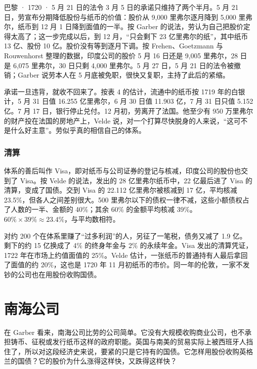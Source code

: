 \begin{case}{巴黎 · 1720 · 5 月 21 日的法令}
3 月 5 日的承诺只维持了两个半月。5 月 21 日，劳宣布分期降低股份与纸币的价值：股价从 9,000 里弗尔逐月降到 5,000 里弗尔，纸币到 12 月 1 日降到面值的一半\cite{velde2003}。按 Garber 的说法，劳认为自己把股价定得太高了；这一步完成以后，到 12 月，“只会剩下 23 亿里弗尔的纸”，其中纸币 13 亿、股份 10 亿\cite{garber1990}。股价没有等到逐月下调。按 Frehen、Goetzmann 与 Rouwenhorst 整理的数据，印度公司的股价 5 月 16 日还是 9,005 里弗尔，28 日是 6,075 里弗尔，30 日只剩 4,000 里弗尔\cite{fgr2009}。5 月 27 日，5 月 21 日的法令被撤销\cite{velde2003}；Garber 说劳本人在 5 月底被免职，很快又复职，主持了此后的紧缩\cite{garber1990}。

承诺一旦违背，就收不回来了。按表 4 的估计，流通中的纸币按 1719 年的白银计，5 月 31 日值 16.255 亿里弗尔，6 月 30 日值 11.903 亿，7 月 31 日只值 5.152 亿\cite{velde2003}。7 月 17 日，银行停止兑付\cite{velde2003}。12 月初，劳离开了法国。他至少有 950 万里弗尔的财产投在法国的房地产上，Velde 说，对一个打算尽快脱身的人来说，“这可不是什么好主意”\cite{velde2003}。劳似乎真的相信自己的体系。
\end{case}

\subsubsection{清算}
体系的善后叫作 Visa，即对纸币与公司证券的登记与核减，印度公司的股份也交到了 Visa\cite{velde2003}。按 Velde 的说法，发出的 28 亿里弗尔纸币中，22 亿最后进了 Visa 的清算，变成了国债。交到 Visa 的 22.112 亿里弗尔被核减到 17 亿，平均核减 23.5\%，但各人之间差别很大。500 里弗尔以下的债权一律不减，这些小额债权占了人数的一半、金额的 40\%；其余 60\% 的金额平均核减 39\%\cite{velde2003}。$60\%\times39\%\approx23.4\%$，与平均数相符。

对约 200 个在体系里赚了“过多利润”的人，另征了一笔税，债务又减了 1.9 亿。剩下的约 15 亿换成了 4\% 的终身年金与 2\% 的永续年金\cite{velde2003}。Visa 发出的清算凭证，1722 年在市场上约值面值的 25\%。Velde 估计，一张纸币的普通持有人最后拿回了面值的约 20\%，这也是 1720 年 11 月初纸币的市价\cite{velde2003}。同一年的伦敦，一家不发钞的公司也在用股份收购国债。

\section{南海公司}\label{sec:merc-southsea}

在 Garber 看来，南海公司比劳的公司简单。它没有大规模收购商业公司，也不承担铸币、征税或发行纸币这样的政府职能。英国与南美的贸易实际上被西班牙人挡住了，所以对这段经济史来说，要紧的只是它持有的国债\cite{garber1990}。它怎样用股份收购英格兰的国债？它的股价为什么涨得这样快，又跌得这样快？

